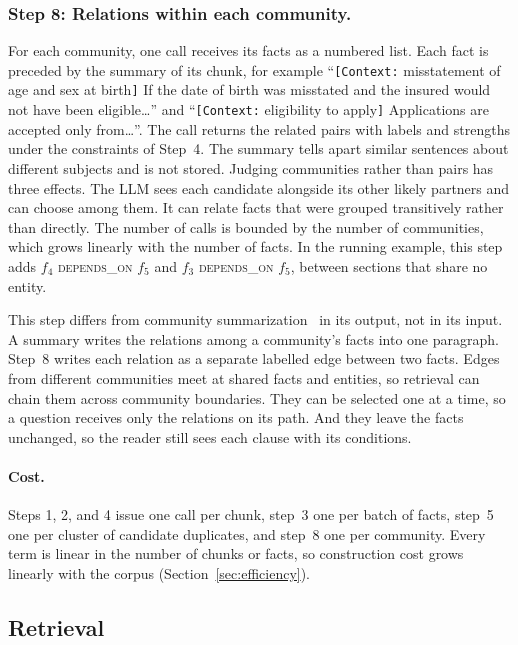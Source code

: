 \documentclass[sigconf, review, anonymous]{acmart}
\newcommand{\rel}[1]{\textsc{#1}}            %
\begin{document}
\subsubsection*{Step 8: Relations within each community.}
For each community, one call receives its facts as a numbered list. Each fact is preceded by the summary of its chunk, for example ``\texttt{[Context:} misstatement of age and sex at birth\texttt{]} If the date of birth was misstated and the insured would not have been eligible\ldots'' and ``\texttt{[Context:} eligibility to apply\texttt{]} Applications are accepted only from\ldots''. The call returns the related pairs with labels and strengths under the constraints of Step~4. The summary tells apart similar sentences about different subjects and is not stored. Judging communities rather than pairs has three effects. The LLM sees each candidate alongside its other likely partners and can choose among them. It can relate facts that were grouped transitively rather than directly. The number of calls is bounded by the number of communities, which grows linearly with the number of facts. In the running example, this step adds $f_4$ \rel{depends\_on} $f_5$ and $f_3$ \rel{depends\_on} $f_5$, between sections that share no entity.

This step differs from community summarization~\cite{edge2024local,zhong2026hygrag} in its output, not in its input. A summary writes the relations among a community's facts into one paragraph. Step~8 writes each relation as a separate labelled edge between two facts. Edges from different communities meet at shared facts and entities, so retrieval can chain them across community boundaries. They can be selected one at a time, so a question receives only the relations on its path. And they leave the facts unchanged, so the reader still sees each clause with its conditions.

\paragraph{\textbf{Cost.}}
Steps 1, 2, and 4 issue one call per chunk, step~3 one per batch of facts, step~5 one per cluster of candidate duplicates, and step~8 one per community. Every term is linear in the number of chunks or facts, so construction cost grows linearly with the corpus (Section~\ref{sec:efficiency}).

\subsection{Retrieval}
\label{sec:retrieval}
\end{document}
